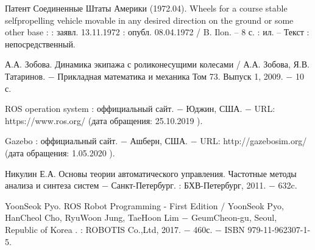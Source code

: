 \documentclass[oneside,final,14pt]{extreport}
\begin{document}
\begin{thebibliography}{0}
Патент  Соединенные Штаты Америки (1972.04). Wheels for a course stable selfpropelling vehicle movable in any desired direction on the ground or some other base :  : заявл. 13.11.1972 : опубл. 08.04.1972 / B. Ilon. – 8 с. : ил. – Текст : непосредственный.

А.А. Зобова.
Динамика экипажа с роликонесущими колесами
/ 
А.А. Зобова, Я.В. Татаринов. 
$-$ Прикладная математика и механика Том	73. Выпуск 1, 2009. $-$ 10 с.

ROS operation system : оффициальный сайт. $-$ Юджин, США. $-$  URL: https://www.ros.org/ (дата обращения: 25.10.2019 ).

Gazebo : оффициальный сайт.  $-$ Ашберн, США. $-$ URL: http://gazebosim.org/ (дата обращения: 1.05.2020 ).


Никулин Е.А. Основы теории автоматического управления. Частотные методы анализа и синтеза систем  $-$ Санкт-Петербург. : БХВ-Петербург, 2011. $-$ 632c.

YoonSeok Pyo.
ROS Robot Programming - First Edition
/
YoonSeok Pyo, HanCheol Cho, RyuWoon Jung, TaeHoon Lim
$-$  GeumCheon-gu, Seoul, Republic of Korea
. : ROBOTIS Co.,Ltd, 2017.
 $-$ 460с.
 $-$ ISBN
 979-11-962307-1-5.


\end{thebibliography}
\end{document}
